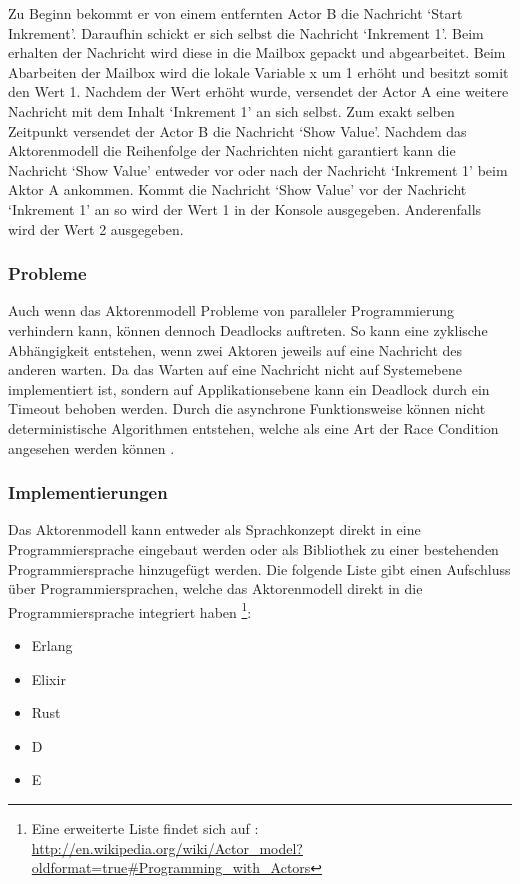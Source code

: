 Zu Beginn bekommt er von einem entfernten Actor B die Nachricht `Start Inkrement'. Daraufhin schickt er sich selbst die Nachricht `Inkrement 1'. Beim erhalten der Nachricht wird diese in die Mailbox gepackt und abgearbeitet. Beim Abarbeiten der Mailbox wird die lokale Variable x um 1 erhöht und besitzt somit den Wert 1. Nachdem der Wert erhöht wurde, versendet der Actor A eine weitere Nachricht mit dem Inhalt `Inkrement 1' an sich selbst. Zum exakt selben Zeitpunkt versendet der Actor B die Nachricht `Show Value'. Nachdem das Aktorenmodell  die Reihenfolge der Nachrichten nicht garantiert kann die Nachricht `Show Value' entweder vor oder nach der Nachricht `Inkrement 1' beim Aktor A ankommen. Kommt die Nachricht `Show Value' vor der Nachricht `Inkrement 1' an so wird der Wert 1 in der Konsole ausgegeben. Anderenfalls wird der Wert 2 ausgegeben.

\subsubsection{Probleme}
Auch wenn das Aktorenmodell Probleme von paralleler Programmierung verhindern kann, können dennoch Deadlocks auftreten. So kann eine zyklische Abhängigkeit entstehen, wenn zwei Aktoren jeweils auf eine Nachricht des anderen warten. Da das Warten auf eine Nachricht nicht auf Systemebene implementiert ist, sondern auf Applikationsebene kann ein Deadlock durch ein Timeout behoben werden. Durch die asynchrone Funktionsweise können nicht deterministische Algorithmen entstehen, welche als eine Art der Race Condition angesehen werden können \cite[p. 86]{Erb2012}. 

\subsubsection{Implementierungen}
Das Aktorenmodell kann entweder als Sprachkonzept direkt in eine Programmiersprache eingebaut werden oder als Bibliothek zu einer bestehenden Programmiersprache hinzugefügt werden. Die folgende Liste gibt einen Aufschluss über Programmiersprachen, welche das Aktorenmodell direkt in die Programmiersprache integriert haben \footnote{Eine erweiterte Liste findet sich auf  \cite[p. 86]{Erb2012}: \url{http://en.wikipedia.org/wiki/Actor_model?oldformat=true#Programming_with_Actors}}:

\begin{itemize}
  \item Erlang
  \item Elixir
  \item Rust
  \item D
  \item E
\end{itemize}

